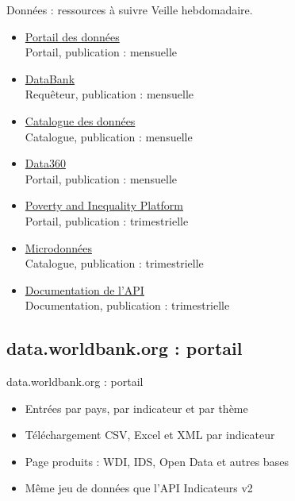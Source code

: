 \documentclass[aspectratio=169,11pt]{beamer}
\begin{document}
\begin{frame}{Données : ressources à suivre}
\small
Veille hebdomadaire.
\begin{itemize}
\item \href{https://data.worldbank.org}{Portail des données}\\{\footnotesize Portail, publication : mensuelle}
\item \href{https://databank.worldbank.org}{DataBank}\\{\footnotesize Requêteur, publication : mensuelle}
\item \href{https://datacatalog.worldbank.org}{Catalogue des données}\\{\footnotesize Catalogue, publication : mensuelle}
\item \href{https://data360.worldbank.org}{Data360}\\{\footnotesize Portail, publication : mensuelle}
\item \href{https://pip.worldbank.org}{Poverty and Inequality Platform}\\{\footnotesize Portail, publication : trimestrielle}
\item \href{https://microdata.worldbank.org}{Microdonnées}\\{\footnotesize Catalogue, publication : trimestrielle}
\item \href{https://datahelpdesk.worldbank.org/knowledgebase/articles/889386-developer-information}{Documentation de l'API}\\{\footnotesize Documentation, publication : trimestrielle}
\end{itemize}
\end{frame}

\subsection{data.worldbank.org : portail}
\begin{frame}{data.worldbank.org : portail}
\begin{itemize}
\item Entrées par pays, par indicateur et par thème
\item Téléchargement CSV, Excel et XML par indicateur
\item Page produits : WDI, IDS, Open Data et autres bases
\item Même jeu de données que l'API Indicateurs v2
\end{itemize}
\end{frame}
\end{document}
